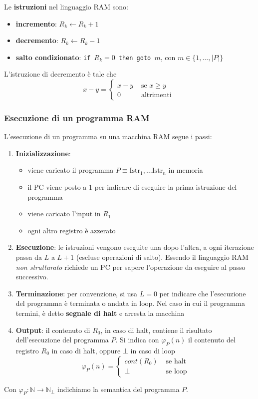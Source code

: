 Le \textbf{istruzioni} nel linguaggio RAM sono: 
\begin{itemize}
	\item \textbf{incremento}: $R_k \leftarrow R_k + 1$
	\item \textbf{decremento}: $R_k \leftarrow R_k - 1$
	\item \textbf{salto condizionato}: \texttt{if $R_k = 0$ then goto $m$}, con $m \in \{1, \dots, |P|\}$
\end{itemize}
L'istruzione di decremento è tale che
$$ x - y = \begin{cases}
	x-y & \text{ se } x \geq y\\
	0 & \text{ altrimenti }
\end{cases}$$

\begin{center}
	
\end{center}

\subsubsection{Esecuzione di un programma RAM}

L'esecuzione di un programma su una macchina RAM segue i passi:
\begin{enumerate}
	\item \textbf{Inizializzazione}:
	\begin{itemize}
		\item viene caricato il programma $P \equiv \text{Istr}_1, \dots \text{Istr}_n$ in memoria
		\item il PC viene posto a 1 per indicare di eseguire la prima istruzione del programma
		\item viene caricato l'input in $R_1$
		\item ogni altro registro è azzerato
	\end{itemize}
	\item \textbf{Esecuzione}: le istruzioni vengono eseguite una dopo l'altra, a ogni iterazione passa da $L$ a $L+1$ (escluse operazioni di salto). Essendo il linguaggio RAM \textit{non strutturato} richiede un PC per sapere l'operazione da eseguire al passo successivo.
	\item \textbf{Terminazione}: per convenzione, si usa $L=0$ per indicare che l'esecuzione del programma è terminata o andata in loop. Nel caso in cui il programma termini, è detto \textbf{segnale di halt} e arresta la macchina
	\item \textbf{Output}: il contenuto di $R_0$, in caso di halt, contiene il risultato dell'esecuzione del programma $P$. Si indica con $\varphi_P(n)$ il contenuto del registro $R_0$ in caso di halt, oppure $\bot$ in caso di loop
	$$ 
	\varphi_P (n) = \begin{cases}
		cont(R_0) & \text{ se halt} \\
		\bot & \text{ se loop}
	\end{cases}
	$$
\end{enumerate}
Con $\varphi_P: \mathbb{N} \rightarrow \mathbb{N}_\bot$ indichiamo la semantica del programma $P$.\\

